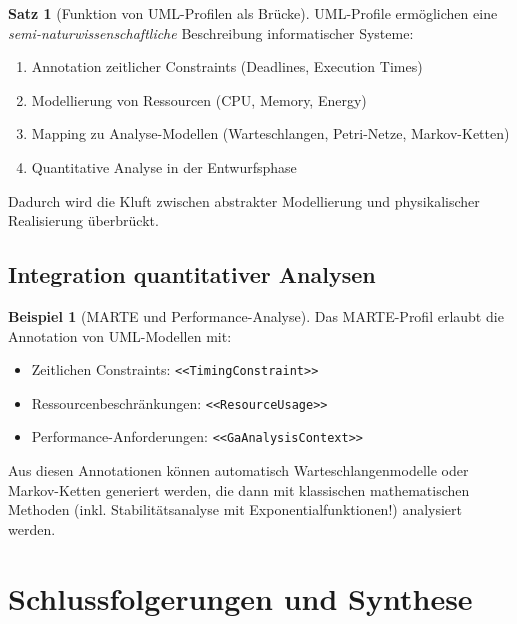 ﻿\documentclass[a4paper,12pt]{report}
\theoremstyle{definition}
\newtheorem{beispiel}{Beispiel}[section]
\newtheorem{satz}{Satz}[section]
\begin{document}
\begin{satz}[Funktion von UML-Profilen als Brücke]
	UML-Profile ermöglichen eine \textit{semi-naturwissenschaftliche} Beschreibung informatischer Systeme:
	\begin{enumerate}
		\item[-] Annotation zeitlicher Constraints (Deadlines, Execution Times)
		\item[-] Modellierung von Ressourcen (CPU, Memory, Energy)
		\item[-] Mapping zu Analyse-Modellen (Warteschlangen, Petri-Netze, Markov-Ketten)
		\item[-] Quantitative Analyse in der Entwurfsphase
	\end{enumerate}
	
	Dadurch wird die Kluft zwischen abstrakter Modellierung und physikalischer Realisierung überbrückt.
\end{satz}

\subsection{Integration quantitativer Analysen}

\begin{beispiel}[MARTE und Performance-Analyse]
	Das MARTE-Profil erlaubt die Annotation von UML-Modellen mit:
	\begin{itemize}
		\item[-] Zeitlichen Constraints: \texttt{<<TimingConstraint>>}
		\item[-] Ressourcenbeschränkungen: \texttt{<<ResourceUsage>>}
		\item[-] Performance-Anforderungen: \texttt{<<GaAnalysisContext>>}
	\end{itemize}
	
	Aus diesen Annotationen können automatisch Warteschlangenmodelle oder Markov-Ketten generiert werden, die dann mit klassischen mathematischen Methoden (inkl. Stabilitätsanalyse mit Exponentialfunktionen!) analysiert werden.
\end{beispiel}

\section{Schlussfolgerungen und Synthese}
\end{document}
